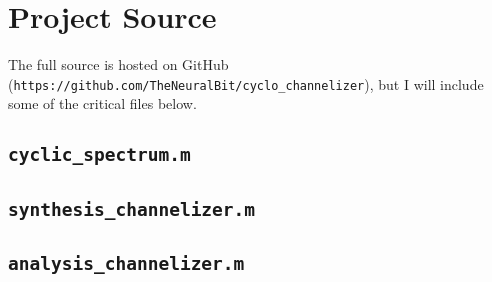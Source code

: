 \documentclass[12pt,dvips]{report}
\begin{document}

\chapter{Project Source}
\label{sec:source}
The full source is hosted on GitHub (\texttt{https://github.com/TheNeuralBit/cyclo\_channelizer}), but I will include some of the critical files below.

\section{\texttt{cyclic\_spectrum.m}}

\section{\texttt{synthesis\_channelizer.m}}

\section{\texttt{analysis\_channelizer.m}}

\end{document}
